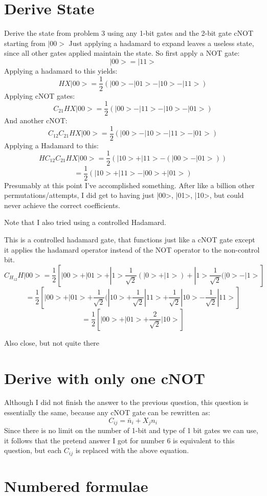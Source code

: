 \documentclass[12pt]{article}
\begin{document}
\section{Derive State}
Derive the state from problem 3 using any 1-bit gates and the 2-bit gate cNOT starting from $|00>$
Just applying a hadamard to expand leaves a useless state, since all other gates applied maintain the state. So first apply a NOT gate:
$$|00> = |11>$$
Applying a hadamard to this yields:
$$HX|00> =  \frac{1}{2}(|00> - |01> - |10> - |11>)$$
Applying cNOT gates:
$$C_{21}HX|00> =  \frac{1}{2}(|00> - |11> - |10> - |01>)$$
And another cNOT:
$$C_{12}C_{21}HX|00> =  \frac{1}{2}(|00> - |10> - |11> - |01>)$$
Applying a Hadamard to this:
$$HC_{12}C_{21}HX|00> =  \frac{1}{2}(|10> + |11> - (|00> - |01>))$$
$$ = \frac{1}{2}(|10> + |11> - |00> + |01>)$$
Presumably at this point I've accomplished something. After like a billion other permutations/attempts, I did get to having just |00>, |01>, |10>, but could never achieve the correct coefficients.

Note that I also tried using a controlled Hadamard.

This is a controlled hadamard gate, that functions just like a cNOT gate except it applies the hadamard operator instead of the NOT operator to the non-control bit.
$$C_{H_{12}}H|00> =  \frac{1}{2}[|00> + |01> + |1> \frac{1}{\sqrt{2}}(|0> + |1>) + |1>  \frac{1}{\sqrt{2}}(|0> - |1>]$$
$$ =  \frac{1}{2}[|00> + |01> +  \frac{1}{\sqrt{2}}(|10> +  \frac{1}{\sqrt{2}}|11> +  \frac{1}{\sqrt{2}}|10> -  \frac{1}{\sqrt{2}}|11>]$$
$$ =  \frac{1}{2}[|00> + |01> + \frac{2}{\sqrt{2}}|10>]$$

Also close, but not quite there

\section{Derive with only one cNOT}
Although I did not finish the answer to the previous question, this question is essentially the same, because any cNOT gate can be rewritten as:
$$C_{ij} = \bar{n}_{i} + X_{j}n_{i}$$
Since there is no limit on the number of 1-bit and type of 1 bit gates we can use, it follows that the pretend answer I got for number 6 is equivalent to this question, but each $C_{ij}$ is replaced with the above equation.



\section{Numbered formulae}
\end{document}
